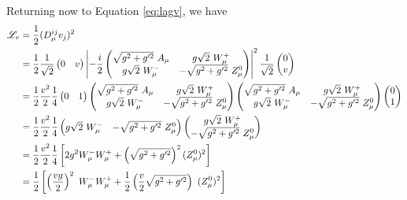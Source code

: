     Returning now to Equation \ref{eq:lagv}, we have
    \begin{equation} \begin{split}
        \label{eq:lagv_full}
        \Lag_v & = \frac{1}{2} (D_{\mu}^{ij} v_j)^2 \\
        & = \frac{1}{2}
            \frac{1}{\sqrt{2}} \begin{pmatrix} 0 & v \end{pmatrix}
            \left| -\frac{i}{2}
                \begin{pmatrix} 
                    \sqrt{g^2 + g^{\prime 2}}\ A_{\mu} & g \sqrt{2}\ W^+_{\mu} \\
                    g \sqrt{2}\ W^-_{\mu} & - \sqrt{g^2 + g^{\prime 2}}\ Z^0_{\mu}
                \end{pmatrix}
            \right|^2
            \frac{1}{\sqrt{2}} \begin{pmatrix} 0 \\ v \end{pmatrix} \\
        & = \frac{1}{2} \frac{v^2}{2} \frac{1}{4}
            \begin{pmatrix} 0 & 1 \end{pmatrix}
            \begin{pmatrix} 
                \sqrt{g^2 + g^{\prime 2}}\ A_{\mu} & g \sqrt{2}\ W^+_{\mu} \\
                g \sqrt{2}\ W^-_{\mu} & - \sqrt{g^2 + g^{\prime 2}}\ Z^0_{\mu}
            \end{pmatrix}
            \begin{pmatrix} 
                \sqrt{g^2 + g^{\prime 2}}\ A_{\mu} & g \sqrt{2}\ W^+_{\mu} \\
                g \sqrt{2}\ W^-_{\mu} & - \sqrt{g^2 + g^{\prime 2}}\ Z^0_{\mu}
            \end{pmatrix}
            \begin{pmatrix} 0 \\ 1 \end{pmatrix} \\
        & = \frac{1}{2} \frac{v^2}{2} \frac{1}{4}
            \begin{pmatrix} 
                g \sqrt{2}\ W^-_{\mu} & - \sqrt{g^2 + g^{\prime 2}}\ Z^0_{\mu}
            \end{pmatrix}
            \begin{pmatrix} 
                 g \sqrt{2}\ W^+_{\mu} \\
                 - \sqrt{g^2 + g^{\prime 2}}\ Z^0_{\mu}
            \end{pmatrix} \\
        & = \frac{1}{2} \frac{v^2}{2} \frac{1}{4} 
            \left[ 2 g^2  W^-_{\mu} W^+_{\mu}
            + \left(\sqrt{g^2 + g^{\prime 2}}\right)^2 (Z^0_{\mu})^2 \right] \\
        & = \frac{1}{2} \left[ \left(\frac{vg}{2}\right)^2\  W^-_{\mu} W^+_{\mu}
            + \frac{1}{2} \left(\frac{v}{2}\sqrt{g^2 + g^{\prime 2}}\right)\ (Z^0_{\mu})^2 \right]
    \end{split} \end{equation}

